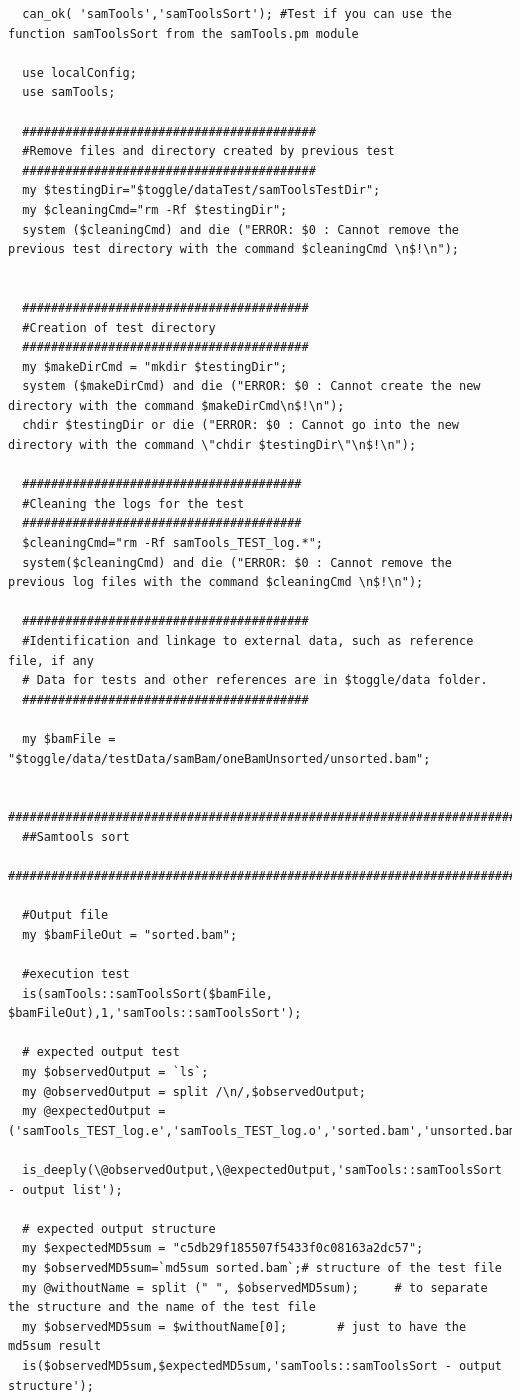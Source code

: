 \documentclass[a4paper,10pt]{report}
\begin{document}
\begin{lstlisting}
  can_ok( 'samTools','samToolsSort'); #Test if you can use the function samToolsSort from the samTools.pm module

  use localConfig;
  use samTools;
  
  #########################################
  #Remove files and directory created by previous test
  #########################################
  my $testingDir="$toggle/dataTest/samToolsTestDir";
  my $cleaningCmd="rm -Rf $testingDir"; 
  system ($cleaningCmd) and die ("ERROR: $0 : Cannot remove the previous test directory with the command $cleaningCmd \n$!\n");


  ########################################
  #Creation of test directory
  ########################################
  my $makeDirCmd = "mkdir $testingDir";
  system ($makeDirCmd) and die ("ERROR: $0 : Cannot create the new directory with the command $makeDirCmd\n$!\n");
  chdir $testingDir or die ("ERROR: $0 : Cannot go into the new directory with the command \"chdir $testingDir\"\n$!\n");

  #######################################
  #Cleaning the logs for the test
  #######################################
  $cleaningCmd="rm -Rf samTools_TEST_log.*";
  system($cleaningCmd) and die ("ERROR: $0 : Cannot remove the previous log files with the command $cleaningCmd \n$!\n");

  ########################################
  #Identification and linkage to external data, such as reference file, if any
  # Data for tests and other references are in $toggle/data folder.
  ########################################
  
  my $bamFile = "$toggle/data/testData/samBam/oneBamUnsorted/unsorted.bam";
  
  ################################################################################################
  ##Samtools sort
  ################################################################################################

  #Output file
  my $bamFileOut = "sorted.bam";

  #execution test
  is(samTools::samToolsSort($bamFile, $bamFileOut),1,'samTools::samToolsSort');

  # expected output test
  my $observedOutput = `ls`;
  my @observedOutput = split /\n/,$observedOutput;
  my @expectedOutput = ('samTools_TEST_log.e','samTools_TEST_log.o','sorted.bam','unsorted.bam');

  is_deeply(\@observedOutput,\@expectedOutput,'samTools::samToolsSort - output list');

  # expected output structure
  my $expectedMD5sum = "c5db29f185507f5433f0c08163a2dc57";
  my $observedMD5sum=`md5sum sorted.bam`;# structure of the test file
  my @withoutName = split (" ", $observedMD5sum);     # to separate the structure and the name of the test file
  my $observedMD5sum = $withoutName[0];       # just to have the md5sum result
  is($observedMD5sum,$expectedMD5sum,'samTools::samToolsSort - output structure');
  
\end{lstlisting}
\end{document}
